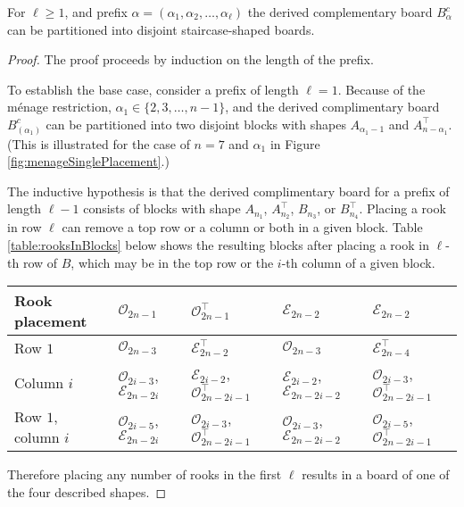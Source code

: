 \begin{lemma}
  For $\ell \geq 1$, and prefix $\alpha = (\alpha_1, \alpha_2, \dots, \alpha_\ell)$
  the derived complementary board $B_\alpha^c$ can be partitioned into
  disjoint staircase-shaped boards.
  \label{lemma:boardShape}
\end{lemma}
\begin{proof}
  The proof proceeds by induction on the length of the prefix.

  To establish the base case, consider a prefix of length $\ell = 1$.
  Because of the m\'enage restriction,
  $\alpha_1 \in \{2, 3, \dots, n-1\}$, and
  the derived complimentary board $B_{(\alpha_1)}^c$
  can be partitioned into two disjoint blocks with shapes
  $A_{\alpha_1 - 1}$ and $A^\intercal_{n - \alpha_1}$.
  (This is illustrated for the case of $n = 7$ and $\alpha_1$ in Figure \ref{fig:menageSinglePlacement}.)

  The inductive hypothesis is that the derived complimentary board for
  a prefix of length $\ell - 1$ consists of blocks with shape
  $A_{n_1}$, $A^\intercal_{n_2}$, $B_{n_3}$, or $B^\intercal_{n_4}$.
  Placing a rook in row $\ell$ can remove a top row or a column or both in a
  given block.
  Table \ref{table:rooksInBlocks} below
  shows the resulting blocks after placing a rook in
  $\ell$-th row of $B$,
  which may be in the top row or the $i$-th column of a given block.

  \begin{tabular}{|l|l|l|l|l|}
  \hline
  Rook placement
    & $\mathcal{O}_{2n-1}$
    & $\mathcal{O}_{2n-1}^\intercal$
    & $\mathcal{E}_{2n-2}$
    & $\mathcal{E}_{2n-2}$
  \\ \hline
  Row $1$
    & $\mathcal{O}_{2n-3}$
    & $\mathcal{E}_{2n-2}^\intercal$
    & $\mathcal{O}_{2n-3}$
    & $\mathcal{E}_{2n-4}^\intercal$
  \\
  Column $i$
    & $\mathcal{O}_{2i-3}$, $\mathcal{E}_{2n-2i}$
    & $\mathcal{E}_{2i-2}$, $\mathcal{O}_{2n-2i-1}^\intercal$
    & $\mathcal{E}_{2i-2}$, $\mathcal{E}_{2n-2i-2}$
    & $\mathcal{O}_{2i-3}$, $\mathcal{O}_{2n-2i-1}^\intercal$
  \\
  Row $1$, column $i$
    & $\mathcal{O}_{2i-5}$, $\mathcal{E}_{2n-2i}$
    & $\mathcal{O}_{2i-3}$, $\mathcal{O}_{2n-2i-1}^\intercal$
    & $\mathcal{O}_{2i-3}$, $\mathcal{E}_{2n-2i-2}$
    & $\mathcal{O}_{2i-5}$, $\mathcal{O}_{2n-2i-1}^\intercal$
  \\ \hline
  \end{tabular}
  \label{table:rooksInBlocks}
  Therefore placing any number of rooks in the first $\ell$ results in a board
  of one of the four described shapes.
\end{proof}

